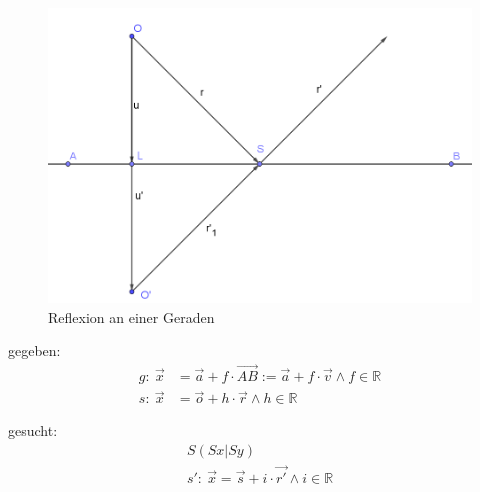 \documentclass[reducespace,stylepage,semiarbeit]{spezidoc}
\begin{document}
\begin{figure}[h]
\centering
\includegraphics[scale=0.5]{pictures/LineRef.png}
\caption{Reflexion an einer Geraden}
\end{figure}

gegeben:
\begin{subequations} 
\begin{align}
g:~ \vec{x} &= \vec{a} + f \cdot \vec{AB} := \vec{a} + f \cdot \vec{v} \wedge f \in \mathds{R} \label{eq:Gg1} \\ 
s:~ \vec{x} &= \vec{o} + h \cdot \vec{r} \wedge h \in \mathds{R} \label{eq:Gg2}
\end{align}
\end{subequations}

gesucht:
\begin{subequations}
\begin{align}
S(Sx|Sy)~~~~~~~~~ \nonumber \\
s':~ \vec{x} = \vec{s} + i \cdot \vec{r'} \wedge i \in \mathds{R} \nonumber
\end{align}
\end{subequations}
\end{document}
